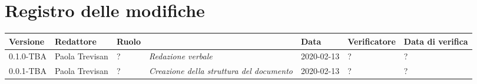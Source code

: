 \section*{Registro delle modifiche}
\renewcommand{\arraystretch}{1.8}

	\begin{longtable}{|p{1.5cm}|p{1.7cm}|p{2cm}|p{2cm}|p{1.7cm}|p{2cm}|p{1.7cm}|}
		\hline
		
		\rowcolor{header}
		\textbf{Versione} & \textbf{Redattore} & \textbf{Ruolo} & \centering{\textbf{Descrizione}} & \textbf{Data}  & \textbf{Verificatore} & \textbf{Data di verifica}  \\
		
		\hline
		0.1.0-TBA & Paola Trevisan & ? & \small{\textit{Redazione verbale}} & 2020-02-13 & ? & ? \\
		0.0.1-TBA & Paola Trevisan & ? & \small{\textit{Creazione della struttura del documento}} & 2020-02-13 & ? & ?\\
		
		\hline
	\end{longtable}